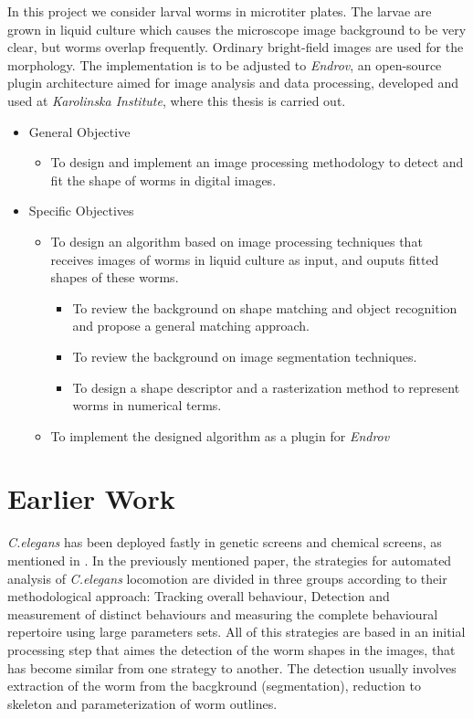 In this project we consider larval worms in microtiter plates. The larvae are 
grown in liquid culture which causes the microscope image background to be 
very clear, but worms overlap frequently. Ordinary bright-field images are 
used for the morphology. The implementation is to be adjusted to \emph{Endrov},
an open-source plugin architecture aimed for image analysis and data processing,
developed and used at \emph{Karolinska Institute}, where this thesis is 
carried out.

\begin{itemize}
\item General Objective
  \begin{itemize}
  \item To design and implement an image processing methodology to detect
    and fit the shape of worms in digital images.    
  \end{itemize}
\end{itemize}
\begin{itemize}
\item Specific Objectives
  \begin{itemize}
  \item To design an algorithm based on image processing techniques that
    receives images of worms in liquid culture as input, and ouputs
    fitted shapes of these worms.
    \begin{itemize}
    \item To review the background on shape matching and object recognition and
      propose a general matching approach.
    \item To review the background on image segmentation techniques.
    \item To design a shape descriptor and a rasterization method to
      represent worms in numerical terms.
    \end{itemize}
  \item To implement the designed algorithm as a plugin for \emph{Endrov}
  \end{itemize}
\end{itemize}

\section{Earlier Work}

\emph{C.elegans} has been deployed fastly in genetic screens and chemical
screens, as mentioned in \cite{automated}. In the previously mentioned paper,
the strategies for automated analysis of \emph{C.elegans} locomotion are
divided in three groups according to their methodological approach:
Tracking overall behaviour, Detection and measurement of distinct behaviours and
measuring the complete behavioural repertoire using large parameters sets.
All of this strategies are based in an initial processing step that aimes 
the detection of the worm shapes in the images, that has become similar
from one strategy to another. The detection usually involves extraction
of the worm from the bacgkround (segmentation), reduction to
skeleton and parameterization of worm outlines.\\

